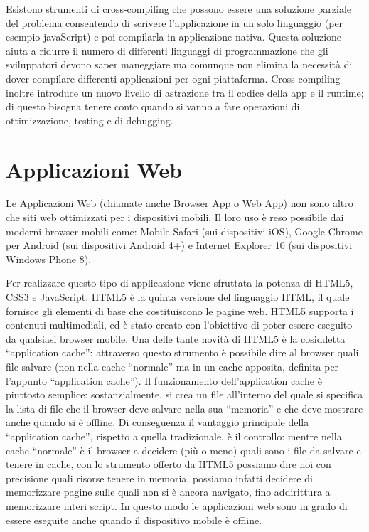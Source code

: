 		Esistono strumenti di cross-compiling che possono essere una soluzione 
		parziale del problema consentendo di scrivere l'applicazione in un solo 
		linguaggio (per esempio javaScript) e poi compilarla in applicazione 
		nativa. Questa soluzione aiuta a ridurre il numero di differenti 
		linguaggi di programmazione che gli sviluppatori devono saper maneggiare 
		ma comunque non elimina la necessità di dover compilare differenti 
		applicazioni per ogni piattaforma. Cross-compiling inoltre introduce un 
		nuovo livello di astrazione tra il codice della app e il runtime; di 
		questo bisogna tenere conto quando si vanno a fare operazioni di 
		ottimizzazione, testing e di debugging.

	\section{Applicazioni Web}
	\label{sec:webapp}
		Le Applicazioni Web (chiamate anche Browser App o Web App) non sono 
		altro che siti web ottimizzati per i dispositivi mobili. Il loro uso è 
		reso possibile dai moderni browser mobili come: Mobile Safari (sui 
		dispositivi iOS), Google Chrome per Android (sui dispositivi Android 4+) 
		e Internet Explorer 10 (sui dispositivi Windows Phone 8).
		
		Per realizzare questo tipo di applicazione viene sfruttata la potenza di 
		HTML5, CSS3 e JavaScript. HTML5 è la quinta versione del linguaggio 
		HTML, il quale fornisce gli elementi di base che costituiscono le pagine 
		web. HTML5 supporta i contenuti multimediali, ed è stato creato con 
		l'obiettivo di poter essere eseguito da qualsiasi browser mobile. Una 
		delle tante novità di HTML5 è la cosiddetta ``application cache'': 
		attraverso questo strumento è possibile dire al browser quali file 
		salvare (non nella cache ``normale'' ma in un cache apposita, definita 
		per l'appunto ``application cache''). Il funzionamento dell'application 
		cache è piuttosto semplice: sostanzialmente, si crea un file all'interno 
		del quale si specifica la lista di file che il browser deve salvare 
		nella sua ``memoria'' e che deve mostrare anche quando si è offline. Di 
		conseguenza il vantaggio principale della ``application cache'', 
		rispetto a quella tradizionale, è il controllo: mentre nella cache 
		``normale'' è il browser a decidere (più o meno) quali sono i file da 
		salvare e tenere in cache, con lo strumento offerto da HTML5 possiamo 
		dire noi con precisione quali risorse tenere in memoria, possiamo 
		infatti decidere di memorizzare pagine sulle quali non si è ancora 
		navigato, fino addirittura a memorizzare interi script. In questo modo 
		le applicazioni web sono in grado di essere eseguite anche quando il 
		dispositivo mobile è offline.

